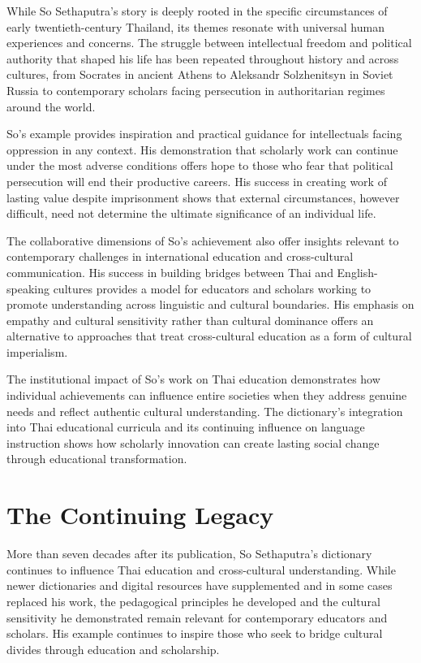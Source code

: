 \documentclass[
  Letterpaper,
]{scrbook}
\begin{document}
While So Sethaputra's story is deeply rooted in the specific
circumstances of early twentieth-century Thailand, its themes resonate
with universal human experiences and concerns. The struggle between
intellectual freedom and political authority that shaped his life has
been repeated throughout history and across cultures, from Socrates in
ancient Athens to Aleksandr Solzhenitsyn in Soviet Russia to
contemporary scholars facing persecution in authoritarian regimes around
the world.

So's example provides inspiration and practical guidance for
intellectuals facing oppression in any context. His demonstration that
scholarly work can continue under the most adverse conditions offers
hope to those who fear that political persecution will end their
productive careers. His success in creating work of lasting value
despite imprisonment shows that external circumstances, however
difficult, need not determine the ultimate significance of an individual
life.

The collaborative dimensions of So's achievement also offer insights
relevant to contemporary challenges in international education and
cross-cultural communication. His success in building bridges between
Thai and English-speaking cultures provides a model for educators and
scholars working to promote understanding across linguistic and cultural
boundaries. His emphasis on empathy and cultural sensitivity rather than
cultural dominance offers an alternative to approaches that treat
cross-cultural education as a form of cultural imperialism.

The institutional impact of So's work on Thai education demonstrates how
individual achievements can influence entire societies when they address
genuine needs and reflect authentic cultural understanding. The
dictionary's integration into Thai educational curricula and its
continuing influence on language instruction shows how scholarly
innovation can create lasting social change through educational
transformation.

\section{The Continuing Legacy}\label{the-continuing-legacy}

More than seven decades after its publication, So Sethaputra's
dictionary continues to influence Thai education and cross-cultural
understanding. While newer dictionaries and digital resources have
supplemented and in some cases replaced his work, the pedagogical
principles he developed and the cultural sensitivity he demonstrated
remain relevant for contemporary educators and scholars. His example
continues to inspire those who seek to bridge cultural divides through
education and scholarship.
\end{document}
